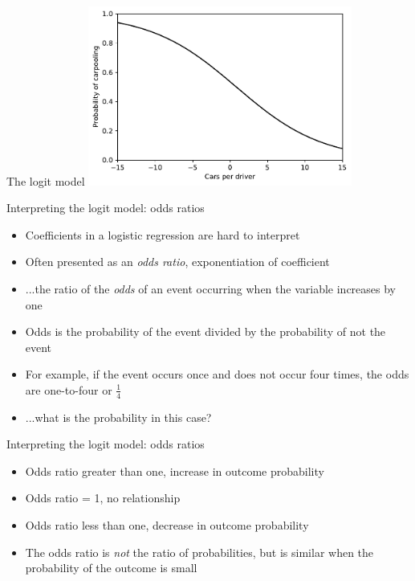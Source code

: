 \begin{frame}{The logit model}
  \centering\includegraphics[width=0.65\textwidth]{fig/logit.pdf}\\
  \tiny\citenhts
\end{frame}

\begin{frame}{Interpreting the logit model: odds ratios}
  \begin{itemize}
    \item Coefficients in a logistic regression are hard to interpret
    \item Often presented as an \emph{odds ratio}, exponentiation of coefficient
    \item ...the ratio of the \emph{odds} of an event occurring when the variable increases by one
    \item Odds is the probability of the event divided by the probability of not the event
    \item For example, if the event occurs once and does not occur four times, the odds are one-to-four or $\frac{1}{4}$
    \pause\item ...what is the probability in this case?
  \end{itemize}
\end{frame}

\begin{frame}{Interpreting the logit model: odds ratios}
  \begin{itemize}
    \item Odds ratio greater than one, increase in outcome probability
    \item Odds ratio = 1, no relationship
    \item Odds ratio less than one, decrease in outcome probability
    \item The odds ratio is \textit{not} the ratio of probabilities, but is similar when the probability of the outcome is small
  \end{itemize}
\end{frame}

